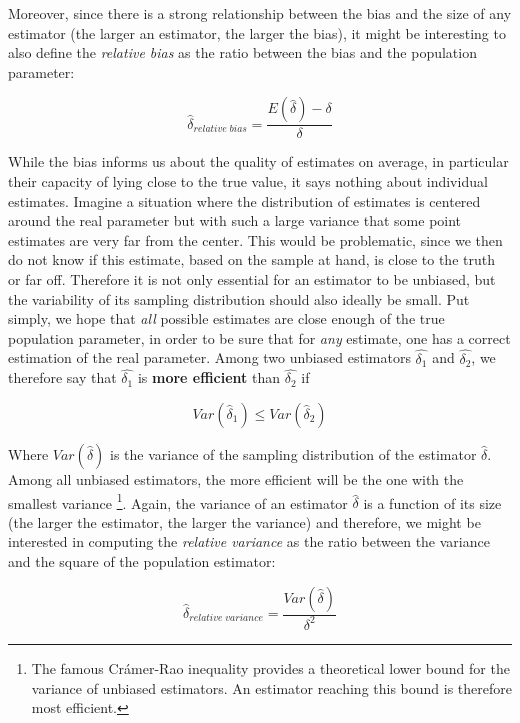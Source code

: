 \documentclass[
  man,floatsintext]{apa6}
\begin{document}
Moreover, since there is a strong relationship between the bias and the size of any estimator (the larger an estimator, the larger the bias), it might be interesting to also define the \emph{relative bias} as the ratio between the bias and the population parameter:

\begin{equation} 
\hat{\delta}_{relative \; bias}=\frac{E(\hat{\delta})-\delta}{\delta}
\label{eq:RELBIAS}
\end{equation}

While the bias informs us about the quality of estimates on average, in particular their capacity of lying close to the true value, it says nothing about individual estimates. Imagine a situation where the distribution of estimates is centered around the real parameter but with such a large variance that some point estimates are very far from the center. This would be problematic, since we then do not know if this estimate, based on the sample at hand, is close to the truth or far off. Therefore it is not only essential for an estimator to be unbiased, but the variability of its sampling distribution should also ideally be small. Put simply, we hope that \emph{all} possible estimates are close enough of the true population parameter, in order to be sure that for \emph{any} estimate, one has a correct estimation of the real parameter. Among two unbiased estimators \(\hat{\delta_1}\) and \(\hat{\delta_2}\), we therefore say that \(\hat{\delta_1}\) is \textbf{more efficient} than \(\hat{\delta_2}\) if

\begin{equation} 
Var(\hat{\delta}_1) \leq Var(\hat{\delta}_2)
\label{eq:EFFICIENCY}
\end{equation}

Where \(Var(\hat{\delta})\) is the variance of the sampling distribution of the estimator \(\hat{\delta}\). Among all unbiased estimators, the more efficient will be the one with the smallest variance \footnote{The famous Cr\'amer-Rao inequality provides a theoretical lower bound for the variance of unbiased estimators. An estimator reaching this bound is therefore most efficient.}. Again, the variance of an estimator \(\hat{\delta}\) is a function of its size (the larger the estimator, the larger the variance) and therefore, we might be interested in computing the \emph{relative variance} as the ratio between the variance and the square of the population estimator:

\begin{equation} 
\hat{\delta}_{relative \; variance}=\frac{Var(\hat{\delta})}{\delta^2}
\label{eq:RELVAR}
\end{equation}
\end{document}
